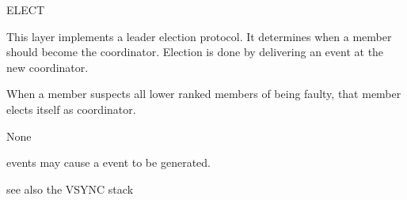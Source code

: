 \begin{Layer}{ELECT}

This layer implements a leader election protocol.  It determines when a member
should become the coordinator.  Election is done by delivering an 
event at the new coordinator.

\begin{Protocol}
When a member suspects all lower ranked members of being faulty, that member elects
itself as coordinator.
\end{Protocol}

\begin{Parameters}
\item None
\end{Parameters}

\begin{Properties}
\item
{} events may cause a  event to be generated.
\end{Properties}

\begin{Sources}
\end{Sources}

\begin{GenEvent}
\end{GenEvent}

\begin{Testing}
\item
see also the VSYNC stack
\end{Testing}
\end{Layer}

